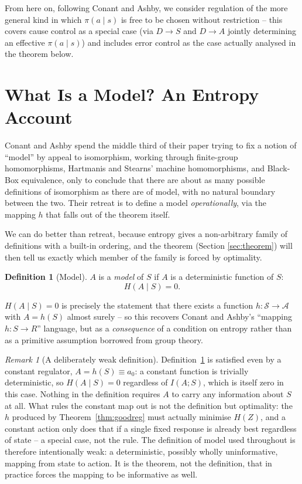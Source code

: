 \documentclass[11pt]{article}
\theoremstyle{definition}
\newtheorem{definition}{Definition}
\theoremstyle{remark}
\newtheorem{remark}{Remark}
\newcommand{\Scal}{\mathcal{S}}
\newcommand{\Acal}{\mathcal{A}}
\begin{document}
From here on, following Conant and Ashby, we consider regulation of the
more general kind in which $\pi(a\mid s)$ is free to be chosen without
restriction -- this covers cause control as a special case (via $D\to S$
and $D\to A$ jointly determining an effective $\pi(a\mid s)$) and includes
error control as the case actually analysed in the theorem below.

\section{What Is a Model? An Entropy Account}
\label{sec:models}

Conant and Ashby spend the middle third of their paper trying to fix a
notion of ``model'' by appeal to isomorphism, working through finite-group
homomorphisms, Hartmanis and Stearns' machine homomorphisms, and Black-Box
equivalence, only to conclude that there are about as many possible
definitions of isomorphism as there are of model, with no natural boundary
between the two. Their retreat is to define a model \emph{operationally},
via the mapping $h$ that falls out of the theorem itself.

We can do better than retreat, because entropy gives a non-arbitrary family
of definitions with a built-in ordering, and the theorem (Section
\ref{sec:theorem}) will then tell us exactly which member of the family is
forced by optimality.

\begin{definition}[Model]
\label{def:model}
$A$ is a \emph{model} of $S$ if $A$ is a deterministic function of $S$:
\[
H(A\mid S) = 0.
\]
\end{definition}

$H(A\mid S)=0$ is precisely the statement that there exists a function
$h:\Scal\to\Acal$ with $A=h(S)$ almost surely -- so this recovers Conant
and Ashby's ``mapping $h:S\to R$'' language, but as a \emph{consequence} of
a condition on entropy rather than as a primitive assumption borrowed from
group theory.

\begin{remark}[A deliberately weak definition]
Definition~\ref{def:model} is satisfied even by a constant regulator,
$A=h(S)\equiv a_0$: a constant function is trivially deterministic, so
$H(A\mid S)=0$ regardless of $I(A;S)$, which is itself zero in this case.
Nothing in the definition requires $A$ to carry any information about $S$
at all. What rules the constant map out is not the definition but
optimality: the $h$ produced by Theorem~\ref{thm:goodreg} must actually
minimise $H(Z)$, and a constant action only does that if a single fixed
response is already best regardless of state -- a special case, not the
rule. The definition of model used throughout is therefore intentionally
weak: a deterministic, possibly wholly uninformative, mapping from state
to action. It is the theorem, not the definition, that in practice forces
the mapping to be informative as well.
\end{remark}
\end{document}
